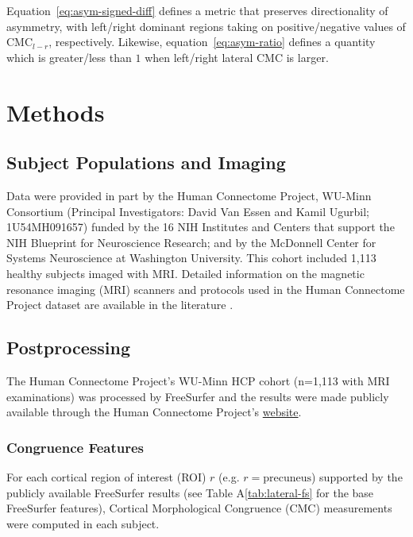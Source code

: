 \documentclass{article}
\begin{document}
Equation~\ref{eq:asym-signed-diff} defines a metric that preserves
directionality of asymmetry, with left/right dominant regions taking on
positive/negative values of \(\text{CMC}_{l - r}\), respectively. Likewise,
equation~\ref{eq:asym-ratio} defines a quantity which is greater/less than
\(1\) when left/right lateral \(\text{CMC}\) is larger.

\section{Methods}
\label{sec:methods}
\subsection{Subject Populations and Imaging}
\label{sec:population}

Data were provided in part by the Human Connectome Project, WU-Minn
Consortium (Principal Investigators: David Van Essen and Kamil Ugurbil;
1U54MH091657) funded by the 16 NIH Institutes and Centers that support the
NIH Blueprint for Neuroscience Research; and by the McDonnell Center for
Systems Neuroscience at Washington University. This cohort included 1,113
healthy subjects imaged with MRI\@. Detailed information on the magnetic
resonance imaging (MRI) scanners and protocols used in the Human Connectome
Project dataset are available in the literature
\citep{elamHumanConnectomeProject2021}.

\subsection{Postprocessing}
\label{sec:postprocessing}

The Human Connectome Project's WU-Minn HCP cohort (n=1,113 with MRI
examinations) was processed by FreeSurfer \citep{fischlFreeSurfer2012} and
the results were made publicly available through the Human Connectome
Project's \href{%
https://www.humanconnectome.org/study/hcp-young-adult/document/1200-subjects-data-release}{website}.


\subsubsection{Congruence Features}
\label{sec:cmc-features}

For each cortical region of interest (ROI) \(r\) (e.g.
\(r=\text{precuneus}\)) supported by the publicly available FreeSurfer
results (see Table A\ref{tab:lateral-fs} for the base FreeSurfer features),
Cortical Morphological Congruence (CMC) measurements were computed in each
subject.
\end{document}
